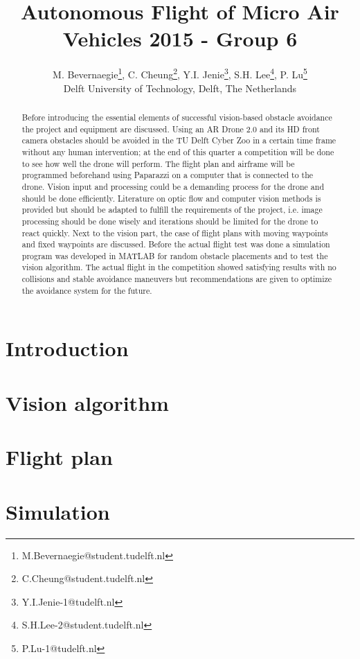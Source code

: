 \documentclass{article}
\title{Autonomous Flight of Micro Air Vehicles 2015 - Group 6}
\author{M. Bevernaegie\thanks{M.Bevernaegie@student.tudelft.nl}, C. Cheung\thanks{C.Cheung@student.tudelft.nl}, Y.I. Jenie\thanks{Y.I.Jenie-1@tudelft.nl}, S.H. Lee\thanks{S.H.Lee-2@student.tudelft.nl}, P. Lu\thanks{P.Lu-1@tudelft.nl} \\ Delft University of Technology, Delft, The Netherlands}
\begin{document}
\maketitle

\begin{abstract}
Before introducing the essential elements of successful vision-based obstacle avoidance the project and equipment are discussed. Using an AR Drone 2.0 and its HD front camera obstacles should be avoided in the TU Delft Cyber Zoo in a certain time frame without any human intervention; at the end of this quarter a competition will be done to see how well the drone will perform. The flight plan and airframe will be programmed beforehand using Paparazzi on a computer that is connected to the drone. Vision input and processing could be a demanding process for the drone and should be done efficiently. Literature on optic flow and computer vision methods is provided but should be adapted to fulfill the requirements of the project, i.e. image processing should be done wisely and iterations should be limited for the drone to react quickly. Next to the vision part, the case of flight plans with moving waypoints and fixed waypoints are discussed. Before the actual flight test was done a simulation program was developed in MATLAB for random obstacle placements and to test the vision algorithm. The actual flight in the competition showed satisfying results with no collisions and stable avoidance maneuvers but recommendations are given to optimize the avoidance system for the future.
\end{abstract}

\section{Introduction} \label{section:introduction}



\section{Vision algorithm}



\section{Flight plan}




\section{Simulation}
\label{section:simulation}


\end{document}
